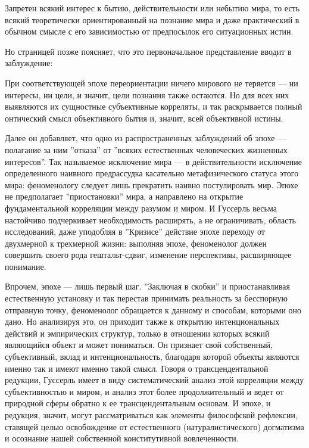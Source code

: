 \documentclass[11pt]{book}
\begin{document}
\smallskip
{}\relax
{}\relax

Запретен всякий интерес к бытию, действительности или небытию мира, то есть всякий теоретически ориентированный на познание мира и даже практический в обычном смысле с его зависимостью от предпосылок его ситуационных истин.

\relax
{}\relax
\smallskip

Но страницей позже поясняет, что это первоначальное представление вводит в заблуждение:

\smallskip
{}\relax
{}\relax

При соответствующей эпохе переориентации ничего мирового не теряется --- ни интересы, ни цели, и значит, цели познания также остаются. Но для всех них выявляются их сущностные субъективные корреляты, и так раскрывается полный онтический смысл объективного бытия и, значит, всей объективной истины.

\relax
{}\relax
\smallskip

Далее он добавляет, что одно из распространенных заблуждений об эпохе --- полагание за ним ''отказа'' от ''всяких естественных человеческих жизненных интересов''. Так называемое исключение мира --- в действительности исключение определенного наивного предрассудка касательно метафизического статуса этого мира: феноменологу следует лишь прекратить наивно постулировать мир. Эпохе не предполагает ''приостановки'' мира, а направлено на открытие фундаментальной корреляции между разумом и миром. И Гуссерль весьма настойчиво подчеркивает необходимость расширять, а не ограничивать, область исследований, даже уподобляя в ''Кризисе'' действие эпохе переходу от двухмерной к трехмерной жизни: выполняя эпохе, феноменолог должен совершить своего рода гештальт-сдвиг, изменение перспективы, расширяющее понимание.

Впрочем, эпохе --- лишь первый шаг. ''Заключая в скобки'' и приостанавливая естественную установку и так перестав принимать реальность за бесспорную отправную точку, феноменолог обращается к данному и способам, которыми оно дано. Но анализируя это, он приходит также к открытию интенциональных действий и эмпирических структур, только в отношении которых всякий являющийся объект и может пониматься. Он признает свой собственный, субъективный, вклад и интенциональность, благодаря которой объекты являются именно так и имеют именно такой смысл. Говоря о трансцендентальной редукции, Гуссерль имеет в виду систематический анализ этой корреляции между субъективностью и миром, и анализ этот более продолжительный и ведет от природной сферы обратно к ее трансцендентальным основам. И эпохе, и редукция, значит, могут рассматриваться как элементы философской рефлексии, ставящей целью освобождение от естественного (натуралистического) догматизма и осознание нашей собственной конститутивной вовлеченности.
\end{document}
